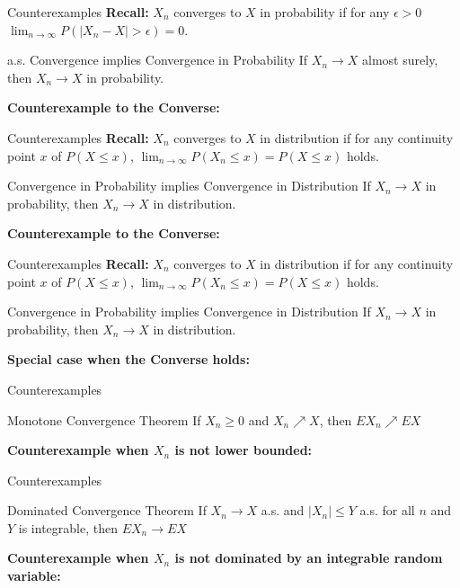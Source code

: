 \documentclass [aspectratio=169]{beamer}
\begin{document}
\begin{frame}{Counterexamples}
    \textbf{Recall:} $X_n$ converges to $X$ in probability if for any $\epsilon>0$ $\lim_{n\to \infty}P(|X_n - X|>\epsilon)=0$.\\
    \begin{block}{a.s. Convergence implies Convergence in Probability}
    If $X_n \to X$ almost surely, then $X_n \to X$ in probability. 
    \end{block}
    \textbf{Counterexample to the Converse: }
    \vspace{1.8in}
\end{frame}

\begin{frame}{Counterexamples}
    \textbf{Recall:} $X_n$ converges to $X$ in distribution if for any continuity point $x$ of $P(X\leq x)$, $\lim_{n\to \infty}P(X_n \leq x) = P(X\leq x)$ holds.\\
    \begin{block}{Convergence in Probability implies Convergence in Distribution}
    If $X_n \to X$ in probability, then $X_n \to X$ in distribution. 
    \end{block}
    \textbf{Counterexample to the Converse: }
    \vspace{1.8in}
\end{frame}

\begin{frame}{Counterexamples}
    \textbf{Recall:} $X_n$ converges to $X$ in distribution if for any continuity point $x$ of $P(X\leq x)$, $\lim_{n\to \infty}P(X_n \leq x) = P(X\leq x)$ holds.\\
    \begin{block}{Convergence in Probability implies Convergence in Distribution}
    If $X_n \to X$ in probability, then $X_n \to X$ in distribution. 
    \end{block}
    \textbf{Special case when the Converse holds: }
    \vspace{1.8in}
\end{frame}

\begin{frame}{Counterexamples}
    \begin{block}{Monotone Convergence Theorem}
    If $X_n \geq 0$ and $X_n \nearrow X$, then $EX_n \nearrow EX$ 
    \end{block}
    \textbf{Counterexample when $X_n$ is not lower bounded: }
    \vspace{1.8in}
\end{frame}


\begin{frame}{Counterexamples}
    \begin{block}{Dominated Convergence Theorem}
    If $X_n \to X$ a.s. and $|X_n| \leq Y$ a.s. for all $n$ and $Y$ is integrable, then $EX_n \to EX$ 
    \end{block}
    \textbf{Counterexample when $X_n$ is not dominated by an integrable random variable: }
    \vspace{1.8in}
\end{frame}
\end{document}
